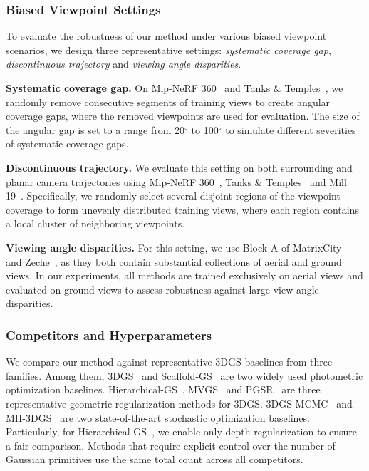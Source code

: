 \documentclass[lettersize,journal]{IEEEtran}
\begin{document}
\subsubsection{Biased Viewpoint Settings}

To evaluate the robustness of our method under various biased viewpoint scenarios, we design three representative settings: \emph{systematic coverage gap}, \emph{discontinuous trajectory} and \emph{viewing angle disparities}.

\textbf{Systematic coverage gap.}
On Mip-NeRF 360~\cite{mipnerf360} and Tanks \& Temples~\cite{tankstemples}, we randomly remove consecutive segments of training views to create angular coverage gaps, where the removed viewpoints are used for evaluation. 
The size of the angular gap is set to a range from 20$^\circ$ to 100$^\circ$ to simulate different severities of systematic coverage gaps.

\textbf{Discontinuous trajectory.}
We evaluate this setting on both surrounding and planar camera trajectories using Mip-NeRF 360~\cite{mipnerf360}, Tanks \& Temples~\cite{tankstemples} and Mill 19~\cite{meganerf}. Specifically, we randomly select several disjoint regions of the viewpoint coverage to form unevenly distributed training views, where each region contains a local cluster of neighboring viewpoints.

\textbf{Viewing angle disparities.}
For this setting, we use Block A of MatrixCity~\cite{matrixcity} and Zeche~\cite{isprs}, as they both contain substantial collections of aerial and ground views. In our experiments, all methods are trained exclusively on aerial views and evaluated on ground views to assess robustness against large view angle disparities.


\subsubsection{Competitors and Hyperparameters}

We compare our method against representative 3DGS baselines from three families. 
Among them, 3DGS~\cite{3dgs} and Scaffold-GS~\cite{scaffold} are two widely used photometric optimization baselines.
Hierarchical-GS~\cite{hierarchical}, MVGS~\cite{mvgs} and PGSR~\cite{pgsr} are three representative geometric regularization methods for 3DGS.
3DGS-MCMC~\cite{mcmc} and MH-3DGS~\cite{mh3dgs} are two state-of-the-art stochastic optimization baselines.
Particularly, for Hierarchical-GS~\cite{hierarchical}, we enable only depth regularization to ensure a fair comparison.
Methods that require explicit control over the number of Gaussian primitives use the same total count across all competitors. 
\end{document}
